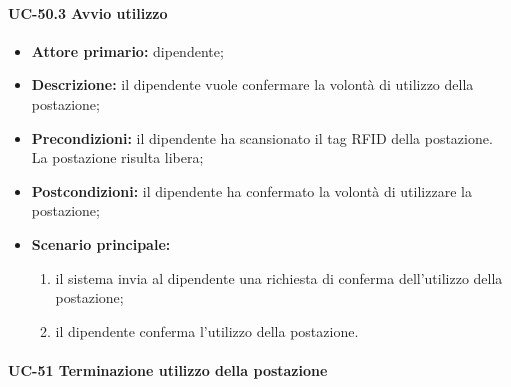 \paragraph{UC-50.3 Avvio utilizzo}

    \begin{itemize}
        \item \textbf{Attore primario:} dipendente;

        \item \textbf{Descrizione:} il dipendente vuole confermare la volontà di utilizzo della postazione;

        \item \textbf{Precondizioni:} il dipendente ha scansionato il tag RFID della postazione. La postazione risulta libera;

        \item \textbf{Postcondizioni:} il dipendente ha confermato la volontà di utilizzare la postazione;

        \item \textbf{Scenario principale:}
            \begin{enumerate}
                \item il sistema invia al dipendente una richiesta di conferma dell'utilizzo della postazione;
                \item il dipendente conferma l'utilizzo della postazione.
            \end{enumerate}
    \end{itemize}

\paragraph{UC-51 Terminazione utilizzo della postazione}

